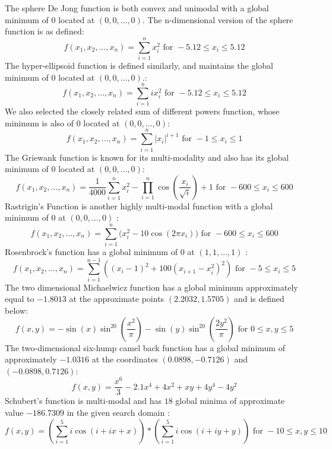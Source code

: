 %
%
The sphere De Jong function is both convex and unimodal with a global minimum of $0$ located at $(0,0,\ldots,0)$. The n-dimensional version of the sphere function is as defined:
\[ f(x_1,x_2,\ldots,x_n) = \sum\limits_{i=1}^n x_i^2 \text{ for } -5.12 \leq x_i \leq 5.12 \]
%
%
The hyper-ellipsoid function is defined similarly, and maintains the global minimum of $0$ located at $(0,0,\ldots,0)$.:
\[ f(x_1,x_2,\ldots,x_n) = \sum\limits_{i=1}^n ix_i^2 \text{ for } -5.12 \leq x_i \leq 5.12\]
%
%
We also selected the closely related sum of different powers function, whose minimum is also of $0$ located at $(0,0,\ldots,0)$:
\[ f(x_1,x_2,\ldots,x_n) = \sum\limits_{i=1}^n |x_i|^{i+1} \text{ for } -1 \leq x_i \leq 1\]
%
%
The Griewank function is known for its multi-modality and also has its global minimum of $0$ located at $(0,0,\ldots,0)$:
 \[ f(x_1,x_2,\ldots,x_n) = \frac{1}{4000}\sum\limits_{i=1}^n x_i^{2} - \prod\limits_{i=1}^{n} \cos \left(\frac{x_i}{\sqrt{i}} \right)+1 \text{ for } -600 \leq x_i \leq 600\]
 Rastrigin's Function is another highly multi-modal function with a global minimum of $0$ at $(0,0,\ldots,0)$ :
 \[f(x_1,x_2,\ldots,x_n) = \sum\limits_{i=1}^n \big( x_i^2 - 10\cos(2\pi x_i) \big)\text{ for } -600 \leq x_i \leq 600\]
 Rosenbrock's function has a global minimum of 0 at $(1,1,\ldots,1)$ :
 \[f(x_1,x_2,\ldots,x_n) = \sum\limits_{i=1}^{n-1} ((x_i-1)^2 + 100(x_{i+1}-x_i^2)^2) \text{ for } -5 \leq x_i \leq 5\]
 The two dimensional Michaelwicz function has a global minimum approximately equal to $-1.8013$ at the approximate points $(2.2032,1.5705)$ and is defined below:
 \[ f(x,y) = -\sin(x)\sin^{20} \left(\frac{x^2}{\pi} \right) - \sin(y)\sin^{20} \left(\frac{2y^2}{\pi} \right) \text{ for } 0 \leq x,y \leq 5\]
 The two-dimensional six-hump camel back function has a global minimum of approximately $-1.0316$ at the coordinates $(0.0898,-0.7126)$ and $(-0.0898,0.7126)$:
 \[f(x,y) = \frac{x^6}{3}-2.1x^4+4x^2+xy+4y^4-4y^2 \]
 Schubert's function is multi-modal and has $18$ global minima of approximate value $-186.7309$ in the given search domain :
 \[ f(x,y) = \left( \sum\limits_{i=1}^{5} i\cos(i + ix + x) \right) * \left( \sum\limits_{i=1}^{5} i\cos(i + iy + y) \right) \text{ for } -10 \leq x,y \leq 10 \]
 
